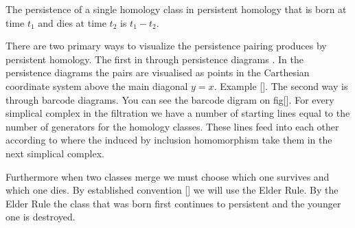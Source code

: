 \begin{defn} The persistence of a single homology class in persistent homology that is born at time $t_1$ and dies at time $t_2$ is $t_1 - t_2$.  \end{defn}

    There are two primary ways to visualize the persistence pairing produces by persistent homology. The first in through persistence diagrams \cite{comp-topo}. In the persistence diagrams the pairs are visualised as points in the Carthesian coordinate system above the main diagonal $y = x$. Example []. The second way is through barcode diagrams. You can see the barcode digram on fig[]. For every simplical complex in the filtration we have a number of starting lines equal to the number of generators for the homology classes. These lines feed into each other according to where the induced by inclusion homomorphism take them in the next simplical complex. 






Furthermore when two classes merge we must choose which one survives and which one dies. By established convention [] we will use the Elder Rule. By the Elder Rule the class that was born first continues to persistent and the younger one is destroyed.






